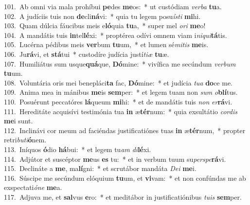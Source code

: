 {101.~}Ab omni via mala prohíbui \textbf{pe}des \textbf{me}os:~* ut custódiam \textit{ver}\textit{ba} \textbf{tu}a.\\
{102.~}A judíciis tuis non \textbf{de}cli\textbf{ná}vi:~* quia tu legem posu\textit{í}\textit{sti} \textbf{mi}hi.\\
{103.~}Quam dúlcia fáucibus meis e\textbf{ló}quia \textbf{tu}a,~* super mel \textit{o}\textit{ri} \textbf{me}o!\\
{104.~}A mandátis tuis \textbf{in}tel\textbf{lé}xi:~* proptérea odívi omnem viam i\textit{ni}\textit{qui}\textbf{tá}tis.\\
{105.~}Lucérna pédibus meis \textbf{ver}bum \textbf{tu}um,~* et lumen sé\textit{mi}\textit{tis} \textbf{me}is.\\
{106.~}Ju\textbf{rá}vi, et \textbf{stá}tui~* custodíre judícia justí\textit{ti}\textit{æ} \textbf{tu}æ.\\
{107.~}Humiliátus sum usque\textbf{quá}que, \textbf{Dó}mine:~* vivífica me secúndum \textit{ver}\textit{bum} \textbf{tu}um.\\
{108.~}Voluntária oris mei benepláci\textbf{ta} fac, \textbf{Dó}mine:~* et judícia \textit{tu}\textit{a} \textbf{do}ce me.\\
{109.~}Anima mea in mánibus \textbf{me}is \textbf{sem}per:~* et legem tuam non \textit{sum} \textit{o}\textbf{blí}tus.\\
{110.~}Posuérunt peccatóres \textbf{lá}queum \textbf{mi}hi:~* et de mandátis tuis \textit{non} \textit{er}\textbf{rá}vi.\\
{111.~}Hereditáte acquisívi testimónia tua \textbf{in} æ\textbf{tér}num:~* quia exsultátio \textit{cor}\textit{dis} \textbf{me}i sunt.\\
{112.~}Inclinávi cor meum ad faciéndas justificatiónes tuas \textbf{in} æ\textbf{tér}num,~* propter retri\textit{bu}\textit{ti}\textbf{ó}nem.\\
{113.~}Iníquos \textbf{ó}dio \textbf{há}bui:~* et legem tu\textit{am} \textit{di}\textbf{lé}xi.\\
{114.~}Adjútor et suscéptor \textbf{me}us \textbf{es} tu:~* et in verbum tuum su\textit{per}\textit{spe}\textbf{rá}vi.\\
{115.~}Declináte a \textbf{me}, ma\textbf{lí}gni:~* et scrutábor mandáta \textit{De}\textit{i} \textbf{me}i.\\
{116.~}Súscipe me secúndum elóquium \textbf{tu}um, et \textbf{vi}vam:~* et non confúndas me ab exspectati\textit{ó}\textit{ne} \textbf{me}a.\\
{117.~}Adjuva me, et \textbf{sal}vus \textbf{e}ro:~* et meditábor in justificatiónibus \textit{tu}\textit{is} \textbf{sem}per.\\
